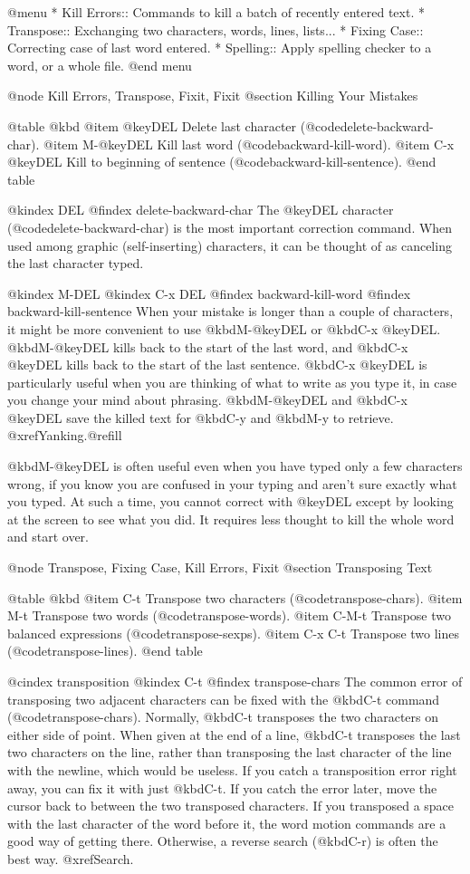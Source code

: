 {{{{{{{{{{{{{{{{@menu
* Kill Errors:: Commands to kill a batch of recently entered text.
* Transpose::   Exchanging two characters, words, lines, lists...
* Fixing Case:: Correcting case of last word entered.
* Spelling::    Apply spelling checker to a word, or a whole file.
@end menu

@node Kill Errors, Transpose, Fixit, Fixit
@section Killing Your Mistakes

@table @kbd
@item @key{DEL}
Delete last character (@code{delete-backward-char}).
@item M-@key{DEL}
Kill last word (@code{backward-kill-word}).
@item C-x @key{DEL}
Kill to beginning of sentence (@code{backward-kill-sentence}).
@end table

@kindex DEL
@findex delete-backward-char
  The @key{DEL} character (@code{delete-backward-char}) is the most
important correction command.  When used among graphic (self-inserting)
characters, it can be thought of as canceling the last character typed.

@kindex M-DEL
@kindex C-x DEL
@findex backward-kill-word
@findex backward-kill-sentence
  When your mistake is longer than a couple of characters, it might be more
convenient to use @kbd{M-@key{DEL}} or @kbd{C-x @key{DEL}}.
@kbd{M-@key{DEL}} kills back to the start of the last word, and @kbd{C-x
@key{DEL}} kills back to the start of the last sentence.  @kbd{C-x
@key{DEL}} is particularly useful when you are thinking of what to write as
you type it, in case you change your mind about phrasing.
@kbd{M-@key{DEL}} and @kbd{C-x @key{DEL}} save the killed text for
@kbd{C-y} and @kbd{M-y} to retrieve.  @xref{Yanking}.@refill

  @kbd{M-@key{DEL}} is often useful even when you have typed only a few
characters wrong, if you know you are confused in your typing and aren't
sure exactly what you typed.  At such a time, you cannot correct with
@key{DEL} except by looking at the screen to see what you did.  It requires
less thought to kill the whole word and start over.

@node Transpose, Fixing Case, Kill Errors, Fixit
@section Transposing Text

@table @kbd
@item C-t
Transpose two characters (@code{transpose-chars}).
@item M-t
Transpose two words (@code{transpose-words}).
@item C-M-t
Transpose two balanced expressions (@code{transpose-sexps}).
@item C-x C-t
Transpose two lines (@code{transpose-lines}).
@end table

@cindex transposition
@kindex C-t
@findex transpose-chars
  The common error of transposing two adjacent characters can be fixed
with the @kbd{C-t} command (@code{transpose-chars}).  Normally,
@kbd{C-t} transposes the two characters on either side of point.  When
given at the end of a line, @kbd{C-t} transposes the last two characters
on the line, rather than transposing the last character of the line with
the newline, which would be useless.  If you catch a
transposition error right away, you can fix it with just @kbd{C-t}.
If you catch the error later,  move the cursor back to between
the two transposed characters.  If you transposed a space with the last
character of the word before it, the word motion commands are a good way
of getting there.  Otherwise, a reverse search (@kbd{C-r}) is often the
best way.  @xref{Search}.

}}}}}}}}}}}}}}}}
